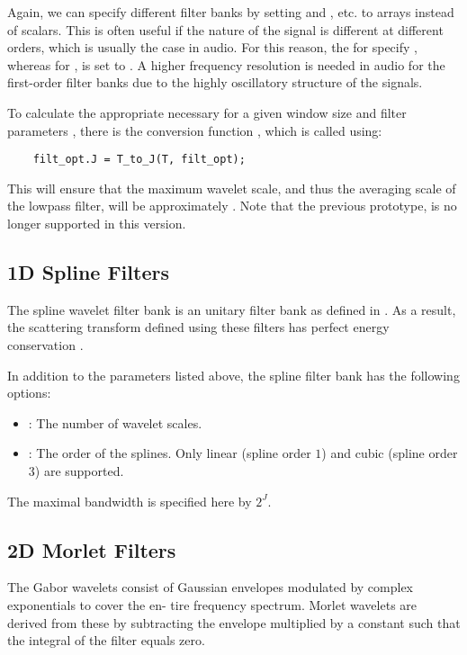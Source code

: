 \documentclass{article}
\begin{document}
Again, we can specify different filter banks by setting  and , etc. to arrays instead of scalars. This is often useful if the nature of the signal is different at different orders, which is usually the case in audio. For this reason, the  for  specify , whereas for ,  is set to . A higher frequency resolution is needed in audio for the first-order filter banks due to the highly oscillatory structure of the signals.

To calculate the appropriate  necessary for a given window size  and filter parameters , there is the conversion function , which is called using:
\begin{lstlisting}
	filt_opt.J = T_to_J(T, filt_opt);
\end{lstlisting}
This will ensure that the maximum wavelet scale, and thus the averaging scale of the lowpass filter, will be approximately . Note that the previous prototype,  is no longer supported in this version.

\subsection{1D Spline Filters}
The spline wavelet filter bank is an unitary filter bank as defined in \cite{mallatbook}. As a result, the scattering transform defined using these filters has perfect energy conservation \cite{stephane}.

In addition to the parameters listed above, the spline filter bank has the following options:
\begin{itemize}
	\item {}: The number of wavelet scales.
	\item {}: The order of the splines. Only linear (spline order $1$) and cubic (spline order $3$) are supported.
\end{itemize}
The maximal bandwidth is specified here by $2^J$.

\subsection{2D Morlet Filters}
\label{sec_filters_2d}
The Gabor wavelets consist of Gaussian envelopes modulated by complex exponentials to cover the en- tire frequency spectrum. Morlet wavelets are derived from these by subtracting the envelope multiplied by a constant such that the integral of the filter equals zero. 
\end{document}
